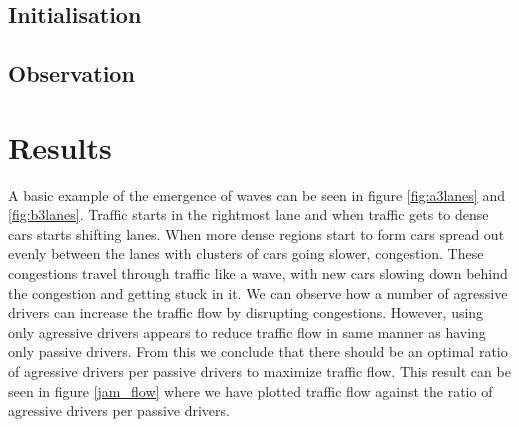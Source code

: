 \documentclass[12pt,a4paper]{article}
\begin{document}
\subsection{Initialisation}

\subsection{Observation}


\section{Results}
A basic example of the emergence of waves can be seen in figure \ref{fig:a3lanes} and \ref{fig:b3lanes}. Traffic starts in the rightmost lane and when traffic gets to dense cars starts shifting lanes. When more dense regions start to form cars spread out evenly between the lanes with clusters of cars going slower, congestion. These congestions travel through traffic like a wave, with new cars slowing down behind the congestion and getting stuck in it.
We can observe how a number of agressive drivers can increase the traffic flow by disrupting congestions. However, using only agressive drivers appears to reduce traffic flow in same manner as having only passive drivers. From this we conclude that there should be an optimal ratio of agressive drivers per passive drivers to maximize traffic flow. This result can be seen in figure \ref{jam_flow} where we have plotted traffic flow against the ratio of agressive drivers per passive drivers.
\end{document}
